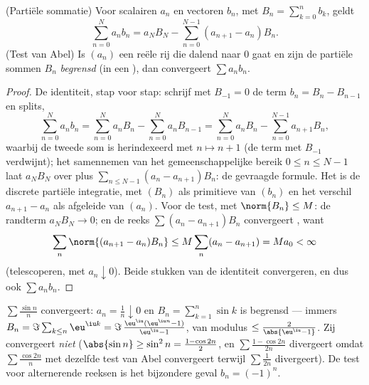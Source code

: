 \begin{theorem}\label{thm:b2:series:abel}
(Partiële sommatie) Voor scalairen $a_n$ en vectoren $b_n$, met
$B_n = \sum_{k=0}^{n} b_k$, geldt
\[
\sum_{n=0}^{N} a_n b_n
= a_N B_N - \sum_{n=0}^{N-1} (a_{n+1} - a_n) B_n .
\]
(Test van Abel) Is $(a_n)$ een reële rij die dalend naar $0$ gaat en
zijn de partiële sommen $B_n$ \emph{begrensd} (in een
), dan convergeert $\sum a_n b_n$.
\end{theorem}

\begin{proof}
De identiteit, stap voor stap: schrijf met $B_{-1} = 0$ de term
$b_n = B_n - B_{n-1}$ en splits,
\[
\sum_{n=0}^{N} a_nb_n
= \sum_{n=0}^{N} a_nB_n - \sum_{n=0}^{N} a_nB_{n-1}
= \sum_{n=0}^{N} a_nB_n - \sum_{n=0}^{N-1} a_{n+1}B_{n} ,
\]
waarbij de tweede som is herindexeerd met $n \mapsto n + 1$ (de
term met $B_{-1}$ verdwijnt); het samennemen van het
gemeenschappelijke bereik $0 \leq n \leq N-1$ laat $a_NB_N$ over
plus $\sum_{n\leq N-1}(a_n - a_{n+1})B_n$: de gevraagde formule.
Het is de discrete partiële integratie, met $(B_n)$ als primitieve
van $(b_n)$ en het verschil $a_{n+1} - a_n$ als afgeleide van
$(a_n)$. Voor de test, met $\norm{B_n} \leq M$: de randterm $a_N
B_N \to 0$; en de reeks $\sum (a_n - a_{n+1})B_n$ convergeert
, want
\[
\sum_n \norm{(a_{n+1} - a_n)B_n} \leq M \sum_n (a_n - a_{n+1})
= M a_0 < \infty
\]
(telescoperen, met $a_n \downarrow 0$). Beide stukken van de
identiteit convergeren, en dus ook $\sum a_n b_n$.
\end{proof}

\begin{example}\label{ex:b2:series:sinn}
$\sum \frac{\sin n}{n}$ convergeert: $a_n = \frac1n \downarrow 0$
en $B_n = \sum_{k=1}^{n} \sin k$ is begrensd --- immers $B_n =
\Im\sum_{k \leq n} \eu^{\iu k} = \Im\,\frac{\eu^{\iu}(\eu^{\iu n} -
1)}{\eu^{\iu} - 1}$, van modulus $\leq \frac{2}{\abs{\eu^{\iu} -
1}}$. Zij convergeert \emph{niet}  ($\abs{\sin n} \geq
\sin^2 n = \frac{1 - \cos 2n}{2}$, en $\sum \frac{1 - \cos 2n}{2n}$
divergeert omdat $\sum \frac{\cos 2n}{n}$ met dezelfde test van
Abel convergeert terwijl $\sum \frac{1}{2n}$ divergeert). De test
voor alternerende reeksen is het bijzondere geval $b_n = (-1)^n$.
\end{example}

